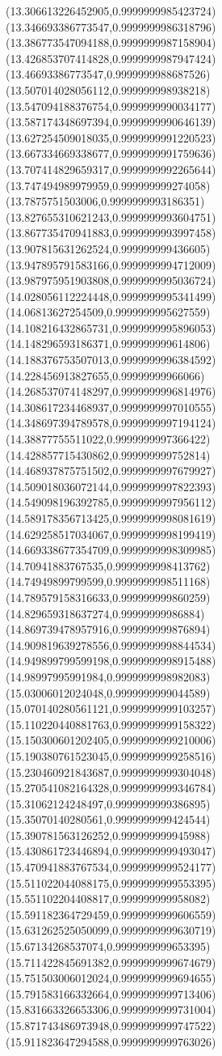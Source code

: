 {(13.306613226452905,0.9999999985423724)
(13.346693386773547,0.9999999986318796)
(13.386773547094188,0.9999999987158904)
(13.426853707414828,0.9999999987947424)
(13.46693386773547,0.9999999988687526)
(13.507014028056112,0.999999998938218)
(13.547094188376754,0.9999999990034177)
(13.587174348697394,0.9999999990646139)
(13.627254509018035,0.9999999991220523)
(13.667334669338677,0.9999999991759636)
(13.707414829659317,0.9999999992265644)
(13.747494989979959,0.999999999274058)
(13.7875751503006,0.9999999993186351)
(13.827655310621243,0.9999999993604751)
(13.867735470941883,0.9999999993997458)
(13.907815631262524,0.999999999436605)
(13.947895791583166,0.9999999994712009)
(13.987975951903808,0.9999999995036724)
(14.028056112224448,0.9999999995341499)
(14.06813627254509,0.9999999995627559)
(14.108216432865731,0.9999999995896053)
(14.148296593186371,0.999999999614806)
(14.188376753507013,0.9999999996384592)
(14.228456913827655,0.99999999966066)
(14.268537074148297,0.9999999996814976)
(14.308617234468937,0.9999999997010555)
(14.348697394789578,0.9999999997194124)
(14.38877755511022,0.9999999997366422)
(14.428857715430862,0.999999999752814)
(14.468937875751502,0.9999999997679927)
(14.509018036072144,0.9999999997822393)
(14.549098196392785,0.9999999997956112)
(14.589178356713425,0.9999999998081619)
(14.629258517034067,0.9999999998199419)
(14.669338677354709,0.9999999998309985)
(14.70941883767535,0.9999999998413762)
(14.74949899799599,0.9999999998511168)
(14.789579158316633,0.999999999860259)
(14.829659318637274,0.99999999986884)
(14.869739478957916,0.999999999876894)
(14.909819639278556,0.9999999998844534)
(14.949899799599198,0.9999999998915488)
(14.98997995991984,0.9999999998982083)
(15.03006012024048,0.9999999999044589)
(15.070140280561121,0.9999999999103257)
(15.110220440881763,0.9999999999158322)
(15.150300601202405,0.9999999999210006)
(15.190380761523045,0.9999999999258516)
(15.230460921843687,0.9999999999304048)
(15.270541082164328,0.9999999999346784)
(15.31062124248497,0.9999999999386895)
(15.35070140280561,0.9999999999424544)
(15.390781563126252,0.999999999945988)
(15.430861723446894,0.9999999999493047)
(15.470941883767534,0.9999999999524177)
(15.511022044088175,0.9999999999553395)
(15.551102204408817,0.999999999958082)
(15.591182364729459,0.9999999999606559)
(15.631262525050099,0.9999999999630719)
(15.67134268537074,0.9999999999653395)
(15.711422845691382,0.9999999999674679)
(15.751503006012024,0.9999999999694655)
(15.791583166332664,0.9999999999713406)
(15.831663326653306,0.9999999999731004)
(15.871743486973948,0.9999999999747522)
(15.911823647294588,0.9999999999763026)
}
